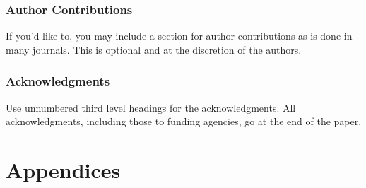 \documentclass{article} %
\begin{document}
\subsubsection*{Author Contributions}
If you'd like to, you may include  a section for author contributions as is done
in many journals. This is optional and at the discretion of the authors.

\subsubsection*{Acknowledgments}
Use unnumbered third level headings for the acknowledgments. All
acknowledgments, including those to funding agencies, go at the end of the paper.
\fi





\newpage 

\appendix

\section*{Appendices}


\end{document}
